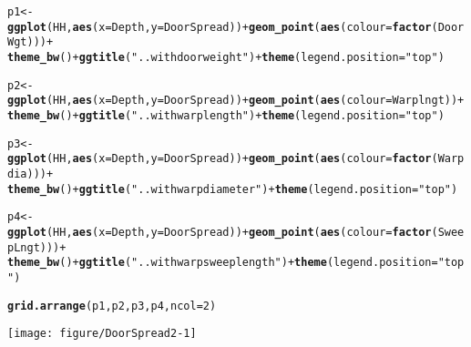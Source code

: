 \documentclass[12pt]{article}\usepackage[]{graphicx}\usepackage[]{color}
\makeatletter
\def\maxwidth{ %
  \ifdim\Gin@nat@width>\linewidth
    \linewidth
  \else
    \Gin@nat@width
  \fi
}
\newcommand{\hlnum}[1]{\textcolor[rgb]{0.686,0.059,0.569}{#1}}%
\newcommand{\hlstr}[1]{\textcolor[rgb]{0.192,0.494,0.8}{#1}}%
\newcommand{\hlopt}[1]{\textcolor[rgb]{0,0,0}{#1}}%
\newcommand{\hlstd}[1]{\textcolor[rgb]{0.345,0.345,0.345}{#1}}%
\newcommand{\hlkwb}[1]{\textcolor[rgb]{0.69,0.353,0.396}{#1}}%
\newcommand{\hlkwc}[1]{\textcolor[rgb]{0.333,0.667,0.333}{#1}}%
\newcommand{\hlkwd}[1]{\textcolor[rgb]{0.737,0.353,0.396}{\textbf{#1}}}%
\newenvironment{kframe}{%
 \def\at@end@of@kframe{}%
 \ifinner\ifhmode%
  \def\at@end@of@kframe{\end{minipage}}%
  \begin{minipage}{\columnwidth}%
 \fi\fi%
 \def\FrameCommand##1{\hskip\@totalleftmargin \hskip-\fboxsep
 \colorbox{shadecolor}{##1}\hskip-\fboxsep
     \hskip-\linewidth \hskip-\@totalleftmargin \hskip\columnwidth}%
 \MakeFramed {\advance\hsize-\width
   \@totalleftmargin\z@ \linewidth\hsize
   \@setminipage}}%
 {\par\unskip\endMakeFramed%
 \at@end@of@kframe}
\newenvironment{knitrout}{}{} %
\makeatother
\begin{document}
\begin{knitrout}\footnotesize
{}\color{fgcolor}\begin{kframe}
\begin{alltt}
\hlstd{p1} \hlkwb{<-} \hlkwd{ggplot}\hlstd{(HH,} \hlkwd{aes}\hlstd{(}\hlkwc{x} \hlstd{= Depth,} \hlkwc{y} \hlstd{= DoorSpread))} \hlopt{+} \hlkwd{geom_point}\hlstd{(}\hlkwd{aes}\hlstd{(}\hlkwc{colour} \hlstd{=} \hlkwd{factor}\hlstd{(DoorWgt)))} \hlopt{+}
    \hlkwd{theme_bw}\hlstd{()} \hlopt{+} \hlkwd{ggtitle}\hlstd{(}\hlstr{"..with door weight"}\hlstd{)} \hlopt{+} \hlkwd{theme}\hlstd{(}\hlkwc{legend.position} \hlstd{=} \hlstr{"top"}\hlstd{)}

\hlstd{p2} \hlkwb{<-} \hlkwd{ggplot}\hlstd{(HH,} \hlkwd{aes}\hlstd{(}\hlkwc{x} \hlstd{= Depth,} \hlkwc{y} \hlstd{= DoorSpread))} \hlopt{+} \hlkwd{geom_point}\hlstd{(}\hlkwd{aes}\hlstd{(}\hlkwc{colour} \hlstd{= Warplngt))} \hlopt{+}
    \hlkwd{theme_bw}\hlstd{()} \hlopt{+} \hlkwd{ggtitle}\hlstd{(}\hlstr{"..with warp length"}\hlstd{)} \hlopt{+} \hlkwd{theme}\hlstd{(}\hlkwc{legend.position} \hlstd{=} \hlstr{"top"}\hlstd{)}

\hlstd{p3} \hlkwb{<-} \hlkwd{ggplot}\hlstd{(HH,} \hlkwd{aes}\hlstd{(}\hlkwc{x} \hlstd{= Depth,} \hlkwc{y} \hlstd{= DoorSpread))} \hlopt{+} \hlkwd{geom_point}\hlstd{(}\hlkwd{aes}\hlstd{(}\hlkwc{colour} \hlstd{=} \hlkwd{factor}\hlstd{(Warpdia)))} \hlopt{+}
    \hlkwd{theme_bw}\hlstd{()} \hlopt{+} \hlkwd{ggtitle}\hlstd{(}\hlstr{"..with warp diameter"}\hlstd{)} \hlopt{+} \hlkwd{theme}\hlstd{(}\hlkwc{legend.position} \hlstd{=} \hlstr{"top"}\hlstd{)}

\hlstd{p4} \hlkwb{<-} \hlkwd{ggplot}\hlstd{(HH,} \hlkwd{aes}\hlstd{(}\hlkwc{x} \hlstd{= Depth,} \hlkwc{y} \hlstd{= DoorSpread))} \hlopt{+} \hlkwd{geom_point}\hlstd{(}\hlkwd{aes}\hlstd{(}\hlkwc{colour} \hlstd{=} \hlkwd{factor}\hlstd{(SweepLngt)))} \hlopt{+}
    \hlkwd{theme_bw}\hlstd{()} \hlopt{+} \hlkwd{ggtitle}\hlstd{(}\hlstr{"..with warp sweep length"}\hlstd{)} \hlopt{+} \hlkwd{theme}\hlstd{(}\hlkwc{legend.position} \hlstd{=} \hlstr{"top"}\hlstd{)}

\hlkwd{grid.arrange}\hlstd{(p1, p2, p3, p4,} \hlkwc{ncol} \hlstd{=} \hlnum{2}\hlstd{)}
\end{alltt}
\end{kframe}

{\centering \texttt{[image: figure/DoorSpread2-1]} 

}



\end{knitrout}
\end{document}

